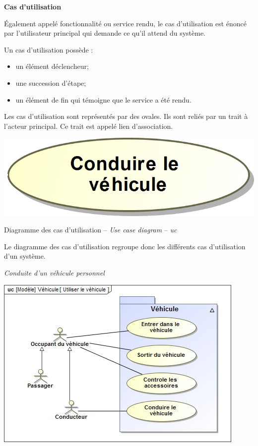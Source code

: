 \documentclass[11pt,oneside]{article}
\begin{document}
\begin{defi}
\textbf{Cas d'utilisation}

Également appelé fonctionnalité ou service rendu, le cas d'utilisation est énoncé par l'utilisateur principal qui demande ce qu'il attend du système. 


Un cas d'utilisation possède : 
\begin{itemize}
\item un élément déclencheur;
\item une succession d'étape;
\item un élément de fin qui témoigne que le service a été rendu.
\end{itemize}

\vspace{.25cm}

\begin{minipage}[c]{.7\textwidth}
Les cas d'utilisation sont représentés par des ovales. Ils sont reliés par un trait à l'acteur principal. Ce trait est appelé lien d'association.
\end{minipage}\hfill
\begin{minipage}[c]{.25\textwidth}
\begin{center}
\includegraphics[width=.9\textwidth]{png/casutilisation}
\end{center}
\end{minipage}
\end{defi}

\begin{defi}
Diagramme des cas d'utilisation -- \textit{Use case diagram} -- \textit{uc}

Le diagramme des cas d'utilisation regroupe donc les différents cas d'utilisation d'un système.

\end{defi}


\begin{exemple}
\textit{Conduite d'un véhicule personnel}

\begin{center}
\includegraphics[width=.5\textwidth]{png/uc_utiliser}
\end{center}

\end{exemple}
\end{document}
